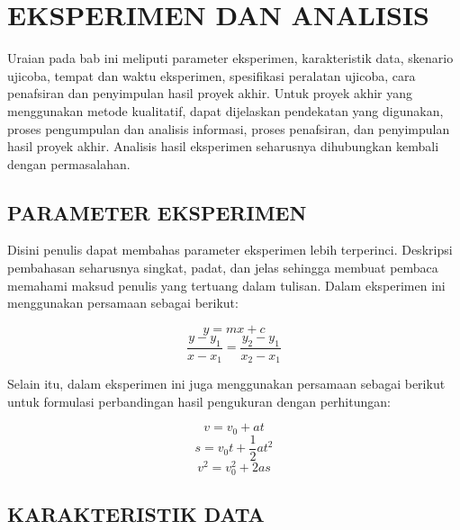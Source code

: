\chapter{EKSPERIMEN DAN ANALISIS}

Uraian pada bab ini meliputi parameter eksperimen, karakteristik data, skenario
ujicoba, tempat dan waktu eksperimen, spesifikasi peralatan ujicoba, cara penafsiran
dan penyimpulan hasil proyek akhir. Untuk proyek akhir yang menggunakan metode
kualitatif, dapat dijelaskan pendekatan yang digunakan, proses pengumpulan dan analisis
informasi, proses penafsiran, dan penyimpulan hasil proyek akhir. Analisis hasil
eksperimen seharusnya dihubungkan kembali dengan permasalahan.

\section{PARAMETER EKSPERIMEN}

Disini penulis dapat membahas parameter eksperimen lebih terperinci. Deskripsi
pembahasan seharusnya singkat, padat, dan jelas sehingga membuat pembaca memahami
maksud penulis yang tertuang dalam tulisan. Dalam eksperimen ini menggunakan persamaan
sebagai berikut:

\begin{equation}
  y = mx + c
  \label{eq:linear}
\end{equation}
\begin{equation}
  \frac{y - y_1}{x - x_1} = \frac{y_2 - y_1}{x_2 - x_1}
  \label{eq:gradien}
\end{equation}

Selain itu, dalam eksperimen ini juga menggunakan persamaan sebagai berikut untuk
formulasi perbandingan hasil pengukuran dengan perhitungan:

\begin{equation}
  v = v_0 + at
  \label{eq:glbb1}
\end{equation}
\begin{equation}
  s = v_0 t + \frac{1}{2}at^2
  \label{eq:glbb2}
\end{equation}
\begin{equation}
  v^2 = v_0^2 + 2as
  \label{eq:glbb3}
\end{equation}

\section{KARAKTERISTIK DATA}


